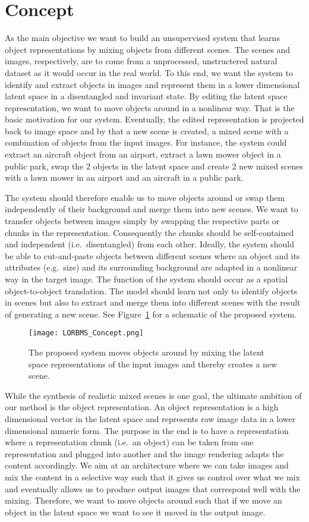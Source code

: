 \documentclass[a4paper,12pt]{report}
\begin{document}
\section{Concept}\label{subsec:concept}
As the main objective we want to build an unsupervised system that learns object representations by mixing objects from different scenes. The scenes and images, respectively, are to come from a unprocessed, unstructered natural dataset as it would occur in the real world. To this end, we want the system to identify and extract objects in images and represent them in a lower dimensional latent space in a disentangled and invariant state. By editing the latent space representation, we want to move objects around in a nonlinear way. That is the basic motivation for our system. Eventually, the edited representation is projected back to image space and by that a new scene is created, a mixed scene with a combination of objects from the input images. For instance, the system could extract an aircraft object from an airport, extract a lawn mower object in a public park, swap the 2 objects in the latent space and create 2 new mixed scenes with a lawn mower in an airport and an aircraft in a public park. 

The system should therefore enable us to move objects around or swap them independently of their background and merge them into new scenes. We want to transfer objects between images simply by swapping the respective parts or chunks in the representation. Consequently the chunks should be self-contained and independent (i.e.\ disentangled) from each other. Ideally, the system should be able to cut-and-paste objects between different scenes where an object and its attributes (e.g.\ size) and its surrounding background are adapted in a nonlinear way in the target image. The function of the system should occur as a spatial object-to-object translation. The model should learn not only to identify objects in scenes but also to extract and merge them into different scenes with the result of generating a new scene. See Figure~\ref{fig:concet_lorbms} for a schematic of the proposed system.
\begin{figure}[ht]
\centering
\texttt{[image: LORBMS\_Concept.png]}
\caption{The proposed system moves objects around by mixing the latent space representations of the input images and thereby creates a new scene.}
\label{fig:concet_lorbms}
\end{figure}
While the synthesis of realistic mixed scenes is one goal, the ultimate ambition of our method is the object representation. An object representation is a high dimensional vector in the latent space and represents raw image data in a lower dimensional numeric form. The purpose in the end is to have a representation where a representation chunk (i.e.\ an object) can be taken from one representation and plugged into another and the image rendering adapts the content accordingly. We aim at an architecture where we can take images and mix the content in a selective way such that it gives us control over what we mix and eventually allows us to produce output images that correspond well with the mixing. Therefore, we want to move objects around such that if we move an object in the latent space we want to see it moved in the output image. 
\end{document}
